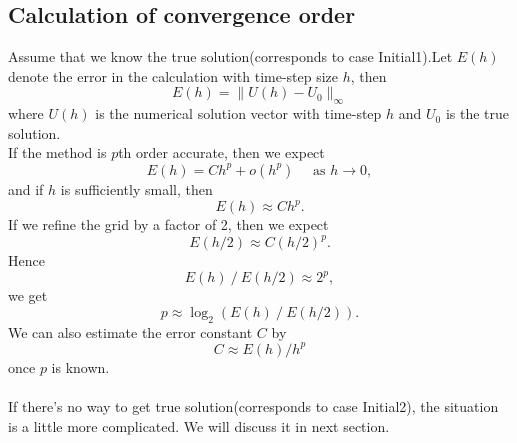 \documentclass[a4paper,twocolumn]{article}
\theoremstyle{definition}
\begin{document}
\subsection{Calculation of convergence order }
Assume that we know the true solution(corresponds to case Initial1).Let $E(h)$ denote the error in the calculation with time-step size $h$, then
$$
E(h)=\|U(h)-U_0\|_{\infty }
$$
where $U(h)$ is the numerical solution vector with time-step $h$ and $U_0$ is the true solution.\\
If the method is $p$th order accurate, then we expect
$$
E(h)=C h^{p}+o\left(h^{p}\right) \quad \text { as } h \rightarrow 0,
$$
and if $h$ is sufficiently small, then
$$
E(h) \approx C h^{p}.
$$
If we refine the grid by a factor of 2, then we expect
$$
E(h / 2) \approx C(h / 2)^{p}.
$$
Hence
$$
E(h)\ /\ E(h / 2) \approx 2^{p},
$$
we get
$$
p \approx \log _{2}(E(h)\ /\ E(h / 2)).
$$
We can also estimate the error constant $C$ by
$$
C \approx E(h) / h^{p}
$$
once $p$ is known.\\\\
If there's no way to get true solution(corresponds to case Initial2), the situation is a little more complicated. We will discuss it in next section.
\newpage
\end{document}
